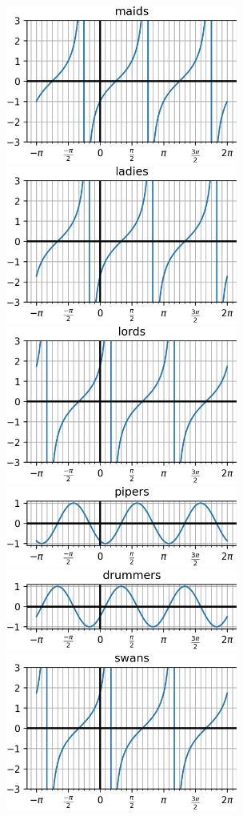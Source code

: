 \documentclass{article}
\begin{document}
\begin{multicols}{2}
\noindent
\includegraphics[width=3in]{maids.png} \\
\includegraphics[width=3in]{ladies.png} \\
\includegraphics[width=3in]{lords.png} \\
\includegraphics[width=3in]{pipers.png} \\
\includegraphics[width=3in]{drummers.png} \\
\includegraphics[width=3in]{swans.png}
\end{multicols}
\end{document}
